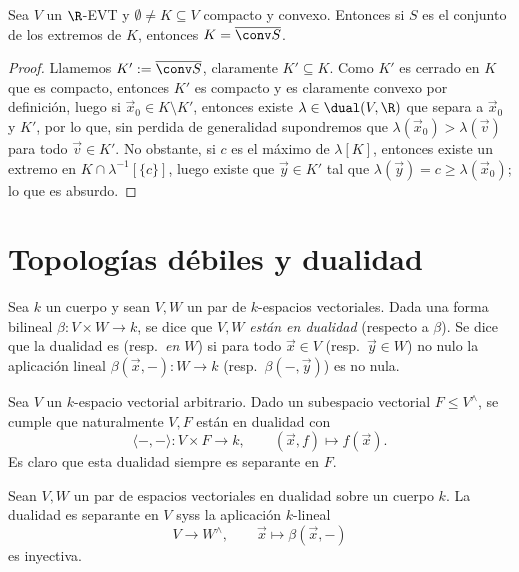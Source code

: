 \documentclass[topologia-analisis.tex]{subfiles}
\begin{document}
\begin{thm}%
	Sea $V$ un $\R$-EVT y $\emptyset \ne K \subseteq V$ compacto y convexo.
	Entonces si $S$ es el conjunto de los extremos de $K$, entonces $K = \overline{\conv S}$.
\end{thm}
\begin{proof}
	Llamemos $K' := \overline{\conv S}$, claramente $K' \subseteq K$.
	Como $K'$ es cerrado en $K$ que es compacto, entonces $K'$ es compacto y es claramente convexo por definición,
	luego si $\vec x_0 \in K \setminus K'$, entonces existe $\lambda \in \dual(V, \R)$ que separa a $\vec x_0$ y $K'$,
	por lo que, sin perdida de generalidad supondremos que $\lambda(\vec x_0) > \lambda(\vec v)$ para todo $\vec v\in K'$.
	No obstante, si $c$ es el máximo de $\lambda[K]$, entonces existe un extremo en $K \cap \lambda^{-1}[ \{c\} ]$,
	luego existe que $\vec y \in K'$ tal que $\lambda(\vec y) = c \ge \lambda(\vec x_0)$; lo que es absurdo.
\end{proof}
\thmdep{}

\section{Topologías débiles y dualidad}
\begin{mydef}
	Sea $k$ un cuerpo y sean $V, W$ un par de $k$-espacios vectoriales.
	Dada una forma bilineal $\beta \colon V\times W \to k$, se dice que $V, W$ \emph{están en dualidad} (respecto a $\beta$).
	Se dice que la dualidad es  (resp.\ \emph{en $W$}) si para todo $\vec x \in V$ (resp.\ $\vec y \in W$) no nulo
	la aplicación lineal $\beta(\vec x, -) \colon W \to k$ (resp.\ $\beta(-, \vec y)$) es no nula.
\end{mydef}
\begin{ex}
	Sea $V$ un $k$-espacio vectorial arbitrario.
	Dado un subespacio vectorial $F \le V^\wedge$, se cumple que naturalmente $V, F$ están en dualidad con
	\[
		\langle -, - \rangle \colon V\times F \longrightarrow k, \qquad (\vec x, f) \longmapsto f(\vec x).
	\]
	Es claro que esta dualidad siempre es separante en $F$.
\end{ex}

\begin{cor}
	Sean $V, W$ un par de espacios vectoriales en dualidad sobre un cuerpo $k$.
	La dualidad es separante en $V$ syss la aplicación $k$-lineal
	\[
		V \longrightarrow W^\wedge, \qquad \vec x \longmapsto \beta(\vec x, -)
	\]
	es inyectiva.
\end{cor}
\end{document}
